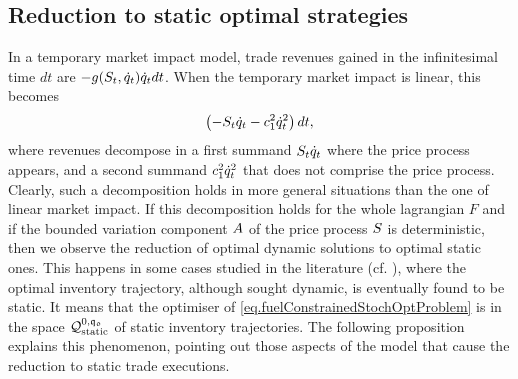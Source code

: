 \documentclass[10pt,a4paper]{article}
\begin{document}
\subsection{Reduction to static optimal strategies}\label{sec.reductionStatic}
In a temporary market impact model, trade revenues gained in the infinitesimal time $dt$  are  $
-g(S_t, \dot{q}_t) \dot{q}_t dt$. When the temporary market impact is linear, this becomes
\begin{equation*}
\left(-S_t \dot{q}_t - c_{1}^{2} \dot{q}_t^{2} \right) dt,
\end{equation*}
where revenues decompose in a first summand $S_t \dot{q}_t$ where the price process appears, and a second summand $c_{1}^{2} \dot{q}_t^{2}$ that does not comprise the price process. Clearly, such a decomposition holds in more general situations than the one of linear market impact. If this decomposition holds for the whole lagrangian $F$ and if the bounded variation component $A$ of the price process $S$ is deterministic, then we observe the reduction of optimal dynamic solutions to optimal static ones.   This happens in some cases studied in the literature (cf. \cite[Sections 6.3 and 6.4]{CJP15alg}), where the optimal inventory trajectory, although sought dynamic, is eventually found to be static. It means that the optimiser of \eqref{eq.fuelConstrainedStochOptProblem} is in the space $\mathcal{Q}_{\text{static}}^{0,\mathfrak{q_0}}$ of static inventory trajectories. The following proposition explains this phenomenon, pointing out those aspects of the model that cause the reduction to static trade executions. 
\end{document}
